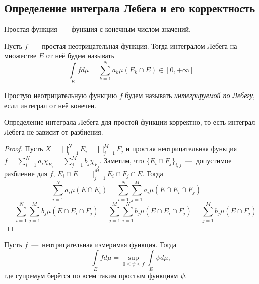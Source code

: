 \subsection{Определение интеграла Лебега и его корректность}
\begin{reminder}
    Простая функция~---~функция с конечным числом значений.
\end{reminder}
\begin{definition}
    Пусть $f$~---~простая неотрицательная функция. Тогда интегралом Лебега на множестве $E$ от неё будем называть \[\int\limits_E fd\mu = \sum\limits_{k = 1}^N a_k\mu(E_k \cap E) \in [0, +\infty]\]
\end{definition}
\begin{definition}
    Простую неотрицательную функцию $f$ будем называть \textit{интегрируемой по Лебегу}, если интеграл от неё конечен.
\end{definition}
\begin{lemma}
    Определение интеграла Лебега для простой функции корректно, то есть интеграл Лебега не зависит от разбиения.
\end{lemma}
\begin{proof}
    Пусть $X = \bigsqcup\limits_{i = 1}^N E_i = \bigsqcup\limits_{j = 1}^M F_j$ и простая неотрицательная функция $f = \sum\limits_{i = 1}^N a_i\chi_{E_i} = \sum\limits_{j = 1}^M b_j\chi_{F_j}$. Заметим, что $\{E_i \cap F_j\}_{i, j}$~---~допустимое разбиение для $f$, $E_i \cap E = \bigsqcup\limits_{j = 1}^M E_i \cap F_j \cap E$. Тогда \[\sum\limits_{i = 1}^N a_i\mu(E \cap E_i) = \sum\limits_{i = 1}^N\sum\limits_{j = 1}^M a_i\mu(E \cap E_i \cap F_j) = \]\[=  \sum\limits_{i = 1}^N\sum\limits_{j = 1}^M b_j\mu(E \cap E_i \cap F_j) = \sum\limits_{j = 1}^M\sum\limits_{i = 1}^N b_j\mu(E \cap E_i \cap F_j) = \sum\limits_{j = 1}^M b_j\mu(E \cap F_j)\]
\end{proof}


\begin{definition}
    Пусть $f$~---~неотрицательная измеримая функция. Тогда \[\int\limits_E fd\mu = \sup\limits_{0 \leq \psi \leq f} \int\limits_E \psi d\mu,\]
    где супремум берётся по всем таким простым функциям $\psi$.
\end{definition}


